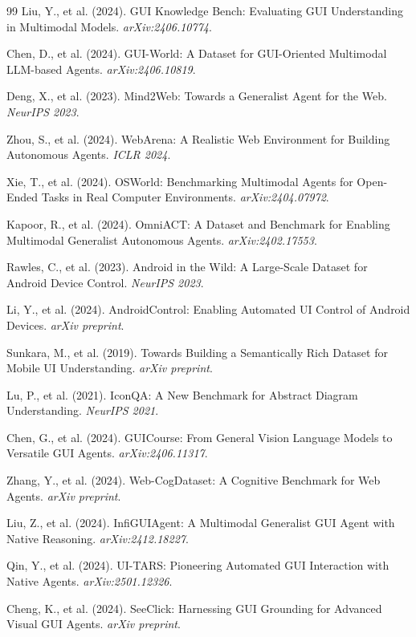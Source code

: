 \documentclass[11pt]{article}
\begin{document}
\begin{thebibliography}{99}
Liu, Y., et al. (2024).
GUI Knowledge Bench: Evaluating GUI Understanding in Multimodal Models.
\textit{arXiv:2406.10774}.

Chen, D., et al. (2024).
GUI-World: A Dataset for GUI-Oriented Multimodal LLM-based Agents.
\textit{arXiv:2406.10819}.

Deng, X., et al. (2023).
Mind2Web: Towards a Generalist Agent for the Web.
\textit{NeurIPS 2023}.

Zhou, S., et al. (2024).
WebArena: A Realistic Web Environment for Building Autonomous Agents.
\textit{ICLR 2024}.

Xie, T., et al. (2024).
OSWorld: Benchmarking Multimodal Agents for Open-Ended Tasks in Real Computer Environments.
\textit{arXiv:2404.07972}.

Kapoor, R., et al. (2024).
OmniACT: A Dataset and Benchmark for Enabling Multimodal Generalist Autonomous Agents.
\textit{arXiv:2402.17553}.

Rawles, C., et al. (2023).
Android in the Wild: A Large-Scale Dataset for Android Device Control.
\textit{NeurIPS 2023}.

Li, Y., et al. (2024).
AndroidControl: Enabling Automated UI Control of Android Devices.
\textit{arXiv preprint}.

Sunkara, M., et al. (2019).
Towards Building a Semantically Rich Dataset for Mobile UI Understanding.
\textit{arXiv preprint}.

Lu, P., et al. (2021).
IconQA: A New Benchmark for Abstract Diagram Understanding.
\textit{NeurIPS 2021}.

Chen, G., et al. (2024).
GUICourse: From General Vision Language Models to Versatile GUI Agents.
\textit{arXiv:2406.11317}.

Zhang, Y., et al. (2024).
Web-CogDataset: A Cognitive Benchmark for Web Agents.
\textit{arXiv preprint}.

Liu, Z., et al. (2024).
InfiGUIAgent: A Multimodal Generalist GUI Agent with Native Reasoning.
\textit{arXiv:2412.18227}.

Qin, Y., et al. (2024).
UI-TARS: Pioneering Automated GUI Interaction with Native Agents.
\textit{arXiv:2501.12326}.

Cheng, K., et al. (2024).
SeeClick: Harnessing GUI Grounding for Advanced Visual GUI Agents.
\textit{arXiv preprint}.


\end{thebibliography}
\end{document}

